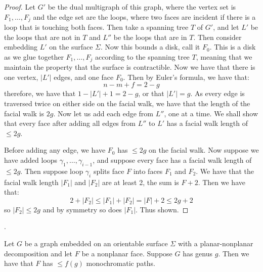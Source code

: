 \begin{proof}
	Let \(G'\) be the dual multigraph of this graph, where the vertex set is \(F_1, \ldots, F_j\) and the edge set are the loops, where two faces are incident if there is a loop that is touching both faces. Then take a spanning tree \(T\) of \(G'\), and let \(L'\) be the loops that are not in \(T\) and \(L''\) be the loops that are in \(T\). 
	Then consider embedding \(L'\) on the surface \(\Sigma\). Now this bounds a disk, call it \(F_0\). This is a disk as we glue together \(F_1, \ldots, F_j\) according to the spanning tree \(T\), meaning that we maintain the property that the surface is contractible.
	Now we have that there is one vertex, \(|L'|\) edges, and one face \(F_0\). Then by Euler's formula, we have that:
	\begin{equation}
		n - m + f = 2 - g
	\end{equation}
	therefore, we have that \(1 - |L'| + 1 = 2 - g\), or that \(|L'| = g\). As every edge is traversed twice on either side on the facial walk, we have that the length of the facial walk is \(2g\). 
	Now let us add each edge from \(L''\), one at a time. We shall show that every face after adding all edges from \(L''\) to \(L'\) has a facial walk length of \(\leq 2g\). 
	
	Before adding any edge, we have \(F_0\) has \(\leq 2g\) on the facial walk. Now suppose we have added loops \(\gamma_1, \ldots, \gamma_{i - 1}\), and suppose every face has a facial walk length of \(\leq 2g\). 
	Then suppose loop \(\gamma_i\) splits face \(F\) into faces \(F_1\) and \(F_2\). We have that the facial walk length \(|F_1|\) and \(|F_2|\) are at least 2, the sum is \(F + 2\). Then we have that: 
	\begin{equation}
		2 + |F_2| \leq |F_1| + |F_2| = |F| + 2 \leq 2g + 2
	\end{equation}
	so \(|F_2| \leq 2g\) and by symmetry so does \(|F_1|\). Thus shown.
\end{proof}
. 

\begin{corollary}\label{corr:orientable_nonplanar_faces}
	Let \(G\) be a graph embedded on an orientable surface \(\Sigma\) with a planar-nonplanar decomposition and let \(F\) be a nonplanar face. Suppose \(G\) has genus \(g\). Then we have that \(F\) has \(\leq f(g)\) monochromatic paths.
\end{corollary}

